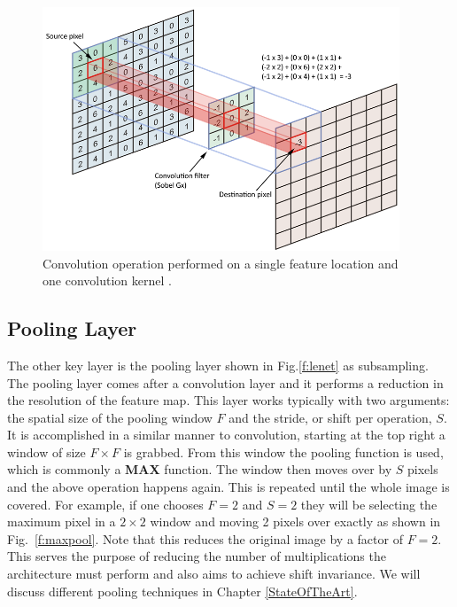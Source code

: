 \begin{figure}[h!]
	\centering
		\includegraphics[width=0.95\textwidth]{figures/convolution.png}
	\caption{Convolution operation performed on a single feature location and one convolution kernel \cite{convolution}.}
	\label{f:convolution}
\end{figure}


\subsection{Pooling Layer}
The other key layer is the pooling layer shown in Fig.\ref{f:lenet} as subsampling. 
The pooling layer comes after a convolution layer and it performs a reduction in the resolution of the feature map. 
This layer works typically with two arguments: the spatial size of the pooling window $F$ and the stride, or shift per operation, $S$.
It is accomplished in a similar manner to convolution, starting at the top right a window of size $F \times F$ is grabbed.
From this window the pooling function is used, which is commonly a \textbf{MAX} function.
The window then moves over by $S$ pixels and the above operation happens again.
This is repeated until the whole image is covered.
For example, if one chooses $F = 2$ and $S = 2$ they will be selecting the maximum pixel in a $2 \times 2$ window and moving 2 pixels over exactly as shown in Fig.~\ref{f:maxpool}.
Note that this reduces the original image by a factor of $F = 2$.
This serves the purpose of reducing the number of multiplications the architecture must perform and also aims to achieve shift invariance. 
We will discuss different pooling techniques in Chapter \ref{StateOfTheArt}.

